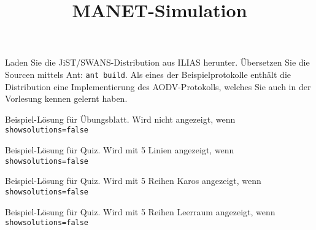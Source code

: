 \documentclass{uulm-assignment}
\title{MANET-Simulation}
\begin{document}
\maketitle


Laden Sie die JiST/SWANS-Distribution aus ILIAS herunter. Übersetzen Sie die Sourcen mittels Ant: \verb|ant build|. Als eines der Beispielprotokolle enthält die Distribution eine Implementierung des AODV-Protokolls, welches Sie auch in der Vorlesung kennen gelernt haben.

\begin{solution}
Beispiel-Lösung für Übungsblatt. Wird nicht angezeigt, wenn \verb|showsolutions=false|
\end{solution}

\begin{solution}[5]
Beispiel-Lösung für Quiz. Wird mit 5 Linien angezeigt, wenn \verb|showsolutions=false|
\end{solution}

\begin{solution}[5][squared]
Beispiel-Lösung für Quiz. Wird mit 5 Reihen Karos angezeigt, wenn \verb|showsolutions=false|
\end{solution}

\begin{solution}[5][blank]
Beispiel-Lösung für Quiz. Wird mit 5 Reihen Leerraum angezeigt, wenn \verb|showsolutions=false|
\end{solution}
\end{document}
